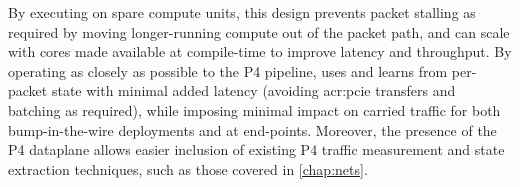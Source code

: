 By executing on spare compute units, this design prevents packet stalling as required by moving longer-running compute out of the packet path, and can scale with cores made available at compile-time to improve latency and throughput.
By operating as closely as possible to the P4 pipeline, \approachshort{} uses and learns from per-packet state with minimal added latency (avoiding \gls{acr:pcie} transfers and batching as required), while imposing minimal impact on carried traffic for both bump-in-the-wire deployments and at end-points.
Moreover, the presence of the P4 dataplane allows easier inclusion of existing P4 traffic measurement and state extraction techniques, such as those covered in \cref{chap:nets}.






